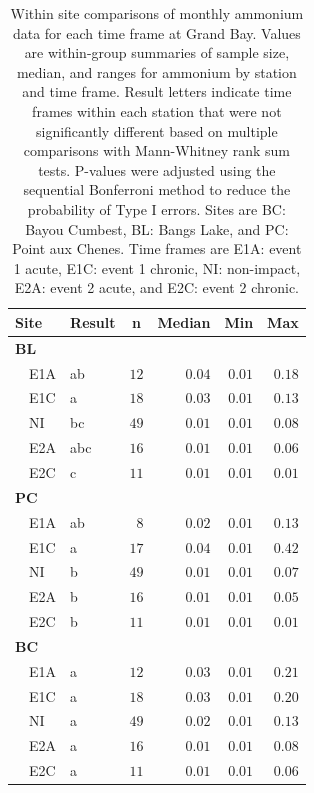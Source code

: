 \documentclass[letterpaper,12pt]{article}\usepackage[]{graphicx}\usepackage[]{color}
\begin{document}
\begin{table}[!tbp]
\caption{Within site comparisons  of monthly ammonium data for each time frame at Grand Bay.  Values are within-group summaries of sample size, median, and ranges for ammonium by station and time frame.  Result letters indicate time frames within each station that were not significantly different based on multiple comparisons with Mann-Whitney rank sum tests.  P-values were adjusted using the sequential Bonferroni method to reduce the probability of Type I errors. Sites are BC: Bayou Cumbest, BL: Bangs Lake, and PC: Point aux Chenes.  Time frames are E1A: event 1 acute, E1C: event 1 chronic, NI: non-impact, E2A: event 2 acute, and E2C: event 2 chronic.\label{tab:ammontab}} 
\begin{center}
\begin{tabular}{llrrrr}
\hline\hline
\multicolumn{1}{l}{Site}&\multicolumn{1}{c}{Result}&\multicolumn{1}{c}{n}&\multicolumn{1}{c}{Median}&\multicolumn{1}{c}{Min}&\multicolumn{1}{c}{Max}\tabularnewline
\hline
{\bfseries BL}&&&&&\tabularnewline
~~E1A&ab&$12$&$0.04$&$0.01$&$0.18$\tabularnewline
~~E1C&a&$18$&$0.03$&$0.01$&$0.13$\tabularnewline
~~NI&bc&$49$&$0.01$&$0.01$&$0.08$\tabularnewline
~~E2A&abc&$16$&$0.01$&$0.01$&$0.06$\tabularnewline
~~E2C&c&$11$&$0.01$&$0.01$&$0.01$\tabularnewline
\hline
{\bfseries PC}&&&&&\tabularnewline
~~E1A&ab&$ 8$&$0.02$&$0.01$&$0.13$\tabularnewline
~~E1C&a&$17$&$0.04$&$0.01$&$0.42$\tabularnewline
~~NI&b&$49$&$0.01$&$0.01$&$0.07$\tabularnewline
~~E2A&b&$16$&$0.01$&$0.01$&$0.05$\tabularnewline
~~E2C&b&$11$&$0.01$&$0.01$&$0.01$\tabularnewline
\hline
{\bfseries BC}&&&&&\tabularnewline
~~E1A&a&$12$&$0.03$&$0.01$&$0.21$\tabularnewline
~~E1C&a&$18$&$0.03$&$0.01$&$0.20$\tabularnewline
~~NI&a&$49$&$0.02$&$0.01$&$0.13$\tabularnewline
~~E2A&a&$16$&$0.01$&$0.01$&$0.08$\tabularnewline
~~E2C&a&$11$&$0.01$&$0.01$&$0.06$\tabularnewline
\hline
\end{tabular}\end{center}

\end{table}

\clearpage
\end{document}
